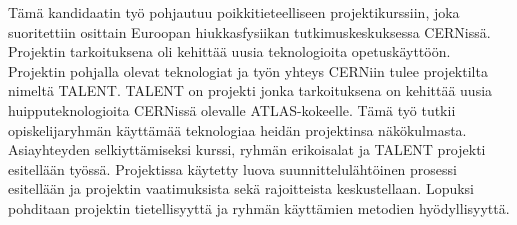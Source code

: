 \documentclass[english,12pt,a4paper,pdftex]{article}
\begin{document}
\begin{otherlanguage}{finnish}
\begin{abstractpage}[finnish]

  Tämä kandidaatin työ pohjautuu poikkitieteelliseen projektikurssiin, joka suoritettiin osittain Euroopan hiukkasfysiikan tutkimuskeskuksessa CERNissä. Projektin tarkoituksena oli kehittää uusia teknologioita opetuskäyttöön. Projektin pohjalla olevat teknologiat ja työn yhteys CERNiin tulee projektilta nimeltä TALENT. TALENT on projekti jonka tarkoituksena on kehittää uusia huipputeknologioita CERNissä olevalle ATLAS-kokeelle. Tämä työ tutkii opiskelijaryhmän käyttämää teknologiaa heidän projektinsa näkökulmasta. Asiayhteyden selkiyttämiseksi kurssi, ryhmän erikoisalat ja TALENT projekti esitellään työssä. Projektissa käytetty luova suunnittelulähtöinen prosessi esitellään ja projektin vaatimuksista sekä rajoitteista keskustellaan. Lopuksi pohditaan projektin tietellisyyttä ja ryhmän käyttämien metodien hyödyllisyyttä. 
  
  
\end{abstractpage}
\end{otherlanguage}
\newpage
%








\end{document}
